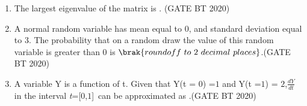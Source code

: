 \documentclass[journal,12pt,onecolumn]{IEEEtran}
\theoremstyle{remark}
\begin{document}
\begin{enumerate}[label=Q\arabic*:]
\item The largest eigenvalue of the matrix 
is  . \hfill(GATE BT 2020)\\

\item A normal random variable has mean equal to 0, and standard deviation equal to 3. The probability that on a random draw the value of this random variable is greater than 0 is    $\brak{roundoff\ to\ 2\ decimal\ places}$.\hfill(GATE BT 2020)\\

\item A variable Y is a function of t. Given that Y(t = $0$) =$ 1$ and Y(t =$ 1$) = $2$,$\frac{dY}{dt}$ in the interval \textit{t}=[$0$,$1$]\ can be approximated as .\hfill(GATE BT 2020)
\end{enumerate}
\end{document}
